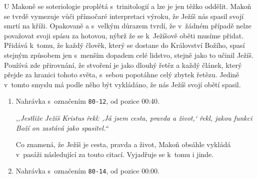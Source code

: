 U Makoně se soteriologie proplétá s~trinitologií a lze je jen těžko oddělit.
Makoň se tvrdě vymezuje vůči přímočaré interpretaci výroku, že Ježíš nás spasil
svojí smrtí na kříži. Opakovaně a s~velkým důrazem tvrdí, že v~žádném případě
nelze považovat svoji spásu za hotovou, nýbrž že se k~Ježíšově oběti musíme
přidat. Přidává k~tomu, že každý člověk, který se dostane do Království Božího,
spasí stejným způsobem jen s~menším dopadem celé lidstvo, stejně jako to učinil
Ježíš. Používá zde přirovnání, že stvoření je jako dlouhý řetěz a každý článek,
který přejde za hranici tohoto světa, s~sebou popotáhne celý zbytek řetězu.
Jedině v~tomto smyslu má podle něho být vykládáno, že nás Ježíš svojí obětí
spasil.

\begin{enumerate}

\item{
Nahrávka s~označením \texttt{80-12}, od pozice 00:40.

\textit{%
,,Jestliže Ježíš Kristus řekl: ,Já jsem cesta, pravda a život,` řekl, jakou
funkci Boží on zastává jako spasitel.``
}

Co znamená, že Ježíš je cesta, pravda a život, Makoň obsáhle vykládá v~pasáži
        následující za touto citací. Vyjadřuje se k~tomu i jinde.

}

\item{
Nahrávka s~označením \texttt{80-14}, od pozice 00:00.

}
\end{enumerate}
